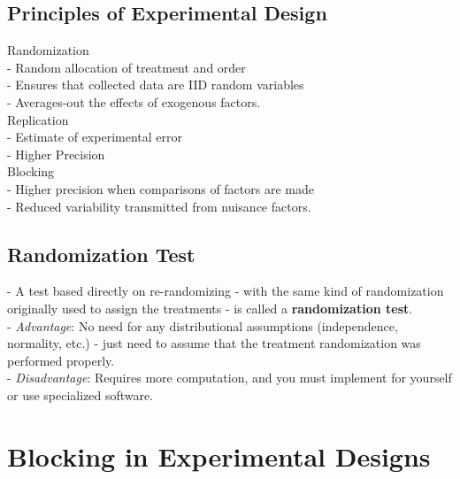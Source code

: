\documentclass[11pt,a4paper]{article}
\begin{document}
\subsection{ Principles of Experimental Design}
Randomization\\
- Random allocation of treatment and order\\
- Ensures that collected data are IID random variables\\
- Averages-out the effects of exogenous factors.\\

Replication\\
- Estimate of experimental error\\
- Higher Precision\\

Blocking\\
- Higher precision when comparisons of factors are made\\
- Reduced variability transmitted from nuisance factors.\\


\subsection{ Randomization Test}
- A test based directly on re-randomizing - with the same kind of randomization originally used to assign the treatments - is called a \textbf{randomization test}.\\

- \textit{Advantage}: No need for any distributional assumptions (independence, normality, etc.) - just need to assume that the treatment randomization was performed properly.\\
- \textit{Disadvantage}: Requires more computation, and you must implement for yourself or use specialized software.

\section{ Blocking in Experimental Designs}
\end{document}
